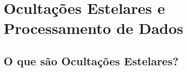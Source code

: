 \documentclass[msc]{on} %
\begin{document}
\chapter{Ocultações Estelares e Processamento de Dados}


\section{O que são Ocultações Estelares?}
\label{sec:fenomenologia}
\end{document}
